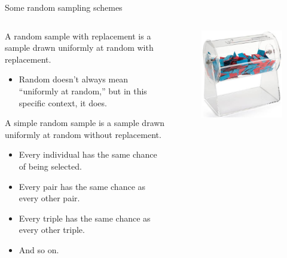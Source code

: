 \documentclass[aspectratio=169]{../latex_main/tntbeamer}  %
\begin{document}
	
		\begin{frame}{Some random sampling schemes}
	    \begin{columns}
	        \begin{column}{.7\textwidth}
	            A random sample with replacement is a sample drawn uniformly at random with replacement.

	            \begin{itemize}
	                \item Random doesn’t always mean “uniformly at random,” but in this specific context, it does.
	            \end{itemize}
	            A simple random sample is a sample drawn uniformly at random without replacement.
                 \begin{itemize}
	                \item Every individual has the same chance of being selected.
	                \item Every pair has the same chance as every other pair.
	                \item Every triple has the same chance as every other triple.
	                \item And so on.

	            \end{itemize}
	        \end{column}
	        
	        \begin{column}{.3\textwidth}
	            \begin{figure}
	                \centering
	                \includegraphics[scale=.5]{Bild14}
	            \end{figure}

	        \end{column}
	        
	    \end{columns}
	    
	\end{frame}
	
\end{document}
